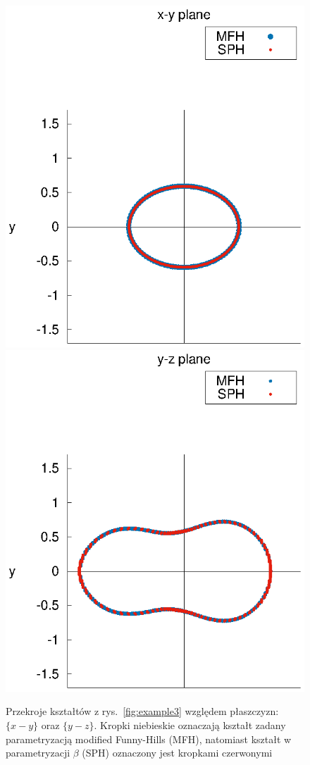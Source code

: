 \documentclass[a4paper,polish,twoside]{article}
\numberwithin{equation}{section}
\begin{document}
\begin{figure}[ht!]
	\centering
	\includegraphics[width=12cm]{xy_plane.eps}\\  
	\includegraphics[width=12cm]{yz_plane.eps}\\    
	\caption{Przekroje kształtów z rys.~\ref{fig:example3} względem płaszczyzn: $\{x-y\}$ oraz $\{y-z\}$. Kropki niebieskie oznaczają kształt zadany parametryzacją modified Funny-Hills (MFH), natomiast kształt w parametryzacji $\beta$ (SPH) oznaczony jest kropkami czerwonymi}
	\label{przekroje}%
\end{figure}
\end{document}
